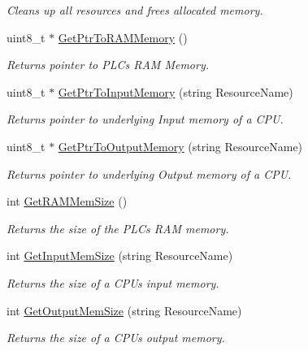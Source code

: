 \begin{DoxyCompactItemize}
\begin{DoxyCompactList}\small\item\em Cleans up all resources and frees allocated memory. \end{DoxyCompactList}\item 
uint8\+\_\+t $\ast$ \hyperlink{classpc__emulator_1_1PCConfigurationInterface_a646a467a93a750510327ceedb7fb1bd9}{Get\+Ptr\+To\+R\+A\+M\+Memory} ()\hypertarget{classpc__emulator_1_1PCConfigurationInterface_a646a467a93a750510327ceedb7fb1bd9}{}\label{classpc__emulator_1_1PCConfigurationInterface_a646a467a93a750510327ceedb7fb1bd9}

\begin{DoxyCompactList}\small\item\em Returns pointer to P\+LC\textquotesingle{}s R\+AM Memory. \end{DoxyCompactList}\item 
uint8\+\_\+t $\ast$ \hyperlink{classpc__emulator_1_1PCConfigurationInterface_afb09deefc9ee060f2117e54c48c1357d}{Get\+Ptr\+To\+Input\+Memory} (string Resource\+Name)
\begin{DoxyCompactList}\small\item\em Returns pointer to underlying Input memory of a C\+PU. \end{DoxyCompactList}\item 
uint8\+\_\+t $\ast$ \hyperlink{classpc__emulator_1_1PCConfigurationInterface_a9685cf3cc6152c11cef901889e2a3607}{Get\+Ptr\+To\+Output\+Memory} (string Resource\+Name)
\begin{DoxyCompactList}\small\item\em Returns pointer to underlying Output memory of a C\+PU. \end{DoxyCompactList}\item 
int \hyperlink{classpc__emulator_1_1PCConfigurationInterface_a31688bbdaa34feed20a542389350a126}{Get\+R\+A\+M\+Mem\+Size} ()\hypertarget{classpc__emulator_1_1PCConfigurationInterface_a31688bbdaa34feed20a542389350a126}{}\label{classpc__emulator_1_1PCConfigurationInterface_a31688bbdaa34feed20a542389350a126}

\begin{DoxyCompactList}\small\item\em Returns the size of the P\+LC\textquotesingle{}s R\+AM memory. \end{DoxyCompactList}\item 
int \hyperlink{classpc__emulator_1_1PCConfigurationInterface_a915c91da9ecab58700b8e70e17a3de85}{Get\+Input\+Mem\+Size} (string Resource\+Name)
\begin{DoxyCompactList}\small\item\em Returns the size of a C\+PU\textquotesingle{}s input memory. \end{DoxyCompactList}\item 
int \hyperlink{classpc__emulator_1_1PCConfigurationInterface_a989a6eec4f1da040ecd8d8c1ec9ee334}{Get\+Output\+Mem\+Size} (string Resource\+Name)
\begin{DoxyCompactList}\small\item\em Returns the size of a C\+PU\textquotesingle{}s output memory. \end{DoxyCompactList}\end{DoxyCompactItemize}
